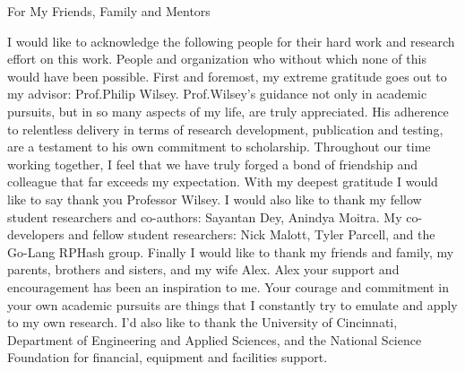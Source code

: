 \begin{center}
 For My Friends, Family and Mentors
\end{center}

I would like to acknowledge the following people for their hard work and research effort on this work. People and organization
who without which none of this would have been possible.  First and foremost, my extreme gratitude goes out to my advisor: 
Prof.\@ Philip Wilsey.  Prof.\@ Wilsey's guidance not only in academic pursuits, but in so many aspects of my life, 
are truly appreciated.  His adherence to relentless delivery in terms of research development, publication and testing, are a
testament to his own commitment to scholarship.  Throughout our time working together, I feel that we have truly forged a bond of
friendship and colleague that far exceeds my expectation.  With my deepest gratitude I would like to say thank you Professor Wilsey.
I would also like to thank my fellow student researchers and co-authors: Sayantan Dey, Anindya Moitra. My co-developers
and fellow student researchers: Nick Malott, Tyler Parcell, and the Go-Lang \textsf{RPHash} group.  Finally I would
like to thank my friends and family, my parents, brothers and sisters, and my wife Alex. Alex your support and
encouragement has been an inspiration to me. Your courage and commitment in your own academic pursuits are things that I constantly
try to emulate and apply to my own research. I'd also like to thank the University of Cincinnati, Department of Engineering
and Applied Sciences, and the National Science Foundation for financial, equipment and facilities support.

\tableofcontents \markright{ }
\listoffigures \markright{ }
\listoftables \markright{ }

\clearpage
{} \setcounter{page}{1}

